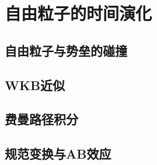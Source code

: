 
\chapter{自由粒子的时间演化}
\label{cpt:4}
\section{自由粒子与势垒的碰撞}
\section{WKB近似}
\section{费曼路径积分}
\section{规范变换与AB效应}